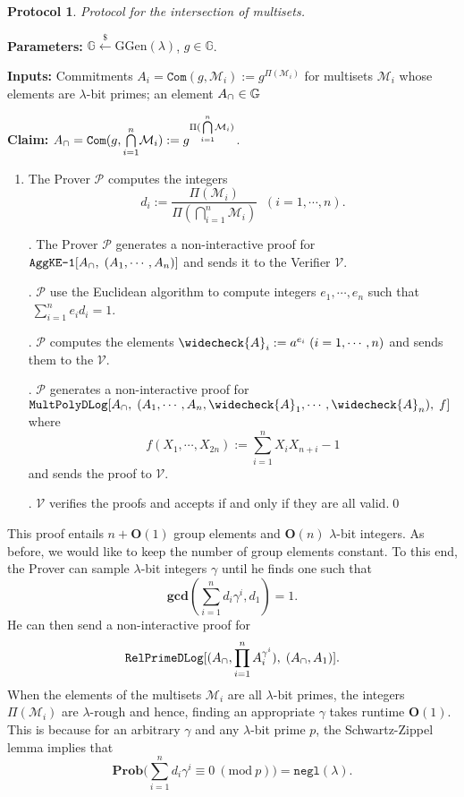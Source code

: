 \documentclass[11pt, lettersize, notitlepage, leqno, footskip=0.6cm]{article}
\newcommand{\pl}{\prod\limits}
\newcommand{\slim}{\sum\limits}
\newcommand{\ttt}{\texttt}
\newcommand{\negl}{\ttt{{negl}}}
\newcommand{\mc}{\mathcal}
\newcommand{\mb}{\mathbb}
\newcommand{\mbf}{\mathbf}
\newcommand{\mr}{\mathrm}
\newcommand{\lam}{\lambda}
\newcommand{\lamb}{\lambda}
\newcommand{\weck}{\widecheck}
\newcommand{\bO}{\mbf{O}}
\newcommand{\mP}{\mc{P}}
\newcommand{\V}{\mc{V}}
\newcommand{\mcM}{\mc{M}}
\newcommand{\vs}{\vspace{-0.15cm}}
\newcommand{\noin}{\noindent}
\newcommand{\Mod}[1]{\ (\mathrm{mod}\ #1)}
\newcommand{\GCD}{\mbf{gcd}}
\newtheorem{Prot}[Thm]{Protocol}
\numberwithin{equation}{section}
\begin{document}
\begin{Prot} Protocol for the intersection of multisets.\end{Prot} \vspace{-0.3cm}

\noin \textbf{Parameters:} $\mb{G}\xleftarrow{\$} \mr{GGen}(\lamb)$,\; $g\in \mb{G}$.

\noin \textbf{Inputs:} Commitments $A_i = \ttt{Com}(g, \mcM_i) := g^{\Pi(\mc{M}_i)}$ for multisets $\mc{M}_i$ whose elements are $\lam$-bit primes; an element $A_{\tt{\cap}}\in\mb{G}$

\noin \textbf{Claim:} $A_{\tt{\cap}} = \protect{\verb|Com|}(g, {\bigcap\limits_{i=1}^n} \mc{M}_i) := g^{\Pi({\bigcap\limits_{i=1}^n} \mc{M}_i)}$.

\begin{enumerate}[wide, labelwidth=!, labelindent=0pt]\vs \item The Prover $\mP$ computes the integers \vs $$d_i:= \frac{\Pi(\mc{M}_i)}{\Pi({\bigcap\limits_{i=1}^n} \mc{M}_i)}\;\; (i=1,\cdots,n).$$

\noin 2. The Prover $\mP$ generates a non-interactive proof for $\ttt{AggKE-1}[A_{\tt{\cap}},\;(A_1,\cdots,A_n)]$ and sends it to the Verifier $\V$.

\noin 3. $\mP$ use the Euclidean algorithm to compute integers $e_1,\cdots,e_n$ such that $\;\slim_{i=1}^n e_id_i = 1$.

\noin 4. $\mP$ computes the elements $\weck{A}_i := a^{e_i}\; (i=1,\cdots,n)$ and sends them to the $\V$.

\noin 5. $\mP$ generates a non-interactive proof for $\ttt{MultPolyDLog}[A_{\tt{\cap}},\; (A_1,\cdots,A_n, \weck{A}_1,\cdots,\weck{A}_n),\;f]$ where \vs $$f(X_1,\cdots,X_{2n}):= \slim_{i=1}^n X_iX_{n+i} - 1 $$ and sends the proof to $\V$.

\noin 6. $\V$ verifies the proofs and accepts if and only if they are all valid.\qed \end{enumerate}

This proof entails $n+\bO(1)$ group elements and $\bO(n)$ $\lam$-bit integers. As before, we would like to keep the number of group elements constant. To this end, the Prover can sample $\lam$-bit integers $\gamma$ until he finds one such that \vs $$\GCD(\slim_{i=1}^n d_i\gamma^i, d_1) = 1 .$$ He can then send a non-interactive proof for \vs $$\ttt{RelPrimeDLog}[(A_{\tt{\cap}},\pl_{i=1}^n A_i^{\gamma^i}),\;(A_{\tt{\cap}}, A_1)].$$ When the elements of the multisets $\mc{M}_i$ are all $\lam$-bit primes, the integers $\Pi(\mcM_i)$ are $\lam$-rough and hence, finding an appropriate $\gamma$ takes runtime $\bO(1)$. This is because for an arbitrary $\gamma$ and any $\lam$-bit prime $p$, the Schwartz-Zippel lemma implies that \vs $$\mbf{Prob}\big(\slim_{i=1}^n d_i\gamma^i \equiv 0\Mod{p} \big) = \negl(\lam). $$ 
\end{document}

